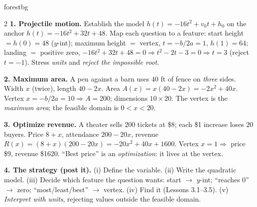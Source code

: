 \documentclass[10pt]{article}
\begin{document}
\begin{skillbox}[Lesson]{forestbg}
\begin{multicols}{2}
\textbf{1. Projectile motion.} Establish the model $h(t)=-16t^2+v_0t+h_0$ on the anchor $h(t)=-16t^2+32t+48$. Map
each question to a feature: start height $=h(0)=48$ ($y$-int); maximum height $=$ vertex, $t=-b/2a=1$, $h(1)=64$;
landing $=$ positive zero, $-16t^2+32t+48=0\Rightarrow t^2-2t-3=0\Rightarrow t=3$ (reject $t=-1$). Stress
\emph{units} and \emph{reject the impossible root}.

\textbf{2. Maximum area.} A pen against a barn uses $40$ ft of fence on \emph{three} sides. Width $x$ (twice),
length $40-2x$. Area $A(x)=x(40-2x)=-2x^2+40x$. Vertex $x=-b/2a=10\Rightarrow A=200$; dimensions $10\times20$.
The vertex is the \emph{maximum area}; the feasible domain is $0<x<20$.

\columnbreak

\textbf{3. Optimize revenue.} A theater sells $200$ tickets at \$8; each \$1 increase loses $20$ buyers. Price
$8+x$, attendance $200-20x$, revenue $R(x)=(8+x)(200-20x)=-20x^2+40x+1600$. Vertex $x=1\Rightarrow$ price \$9,
revenue \$1620. ``Best price'' is an \emph{optimization}: it lives at the vertex.

\textbf{4. The strategy (post it).} (i) Define the variable. (ii) Write the quadratic model. (iii) Decide which
feature the question wants: start $\to$ $y$-int; ``reaches $0$'' $\to$ zero; ``most/least/best'' $\to$ vertex.
(iv) Find it (Lessons 3.1--3.5). (v) \emph{Interpret with units}, rejecting values outside the feasible domain.
\end{multicols}
\end{skillbox}
\end{document}
